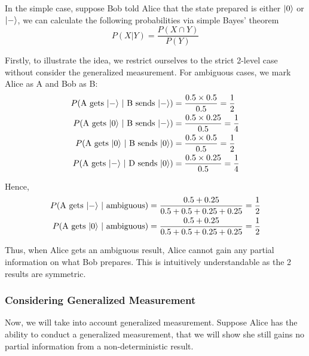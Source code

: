 \documentclass[%
 reprint,
superscriptaddress,
 amsmath,amssymb,
 aps,
]{revtex4-2}
\begin{document}
In the simple case, suppose Bob told Alice that the state prepared is either $\ket{0}$ or $\ket{-}$, we can calculate the following probabilities via simple Bayes' theorem 
\begin{equation}
    P(X|Y) = \frac{P(X \cap Y)}{P(Y)}
\end{equation}

Firstly, to illustrate the idea, we restrict ourselves to the strict 2-level case without consider the generalized measurement. For ambiguous cases, we mark Alice as A and Bob as B:
\begin{equation}
    \begin{split}
        P(\text{A gets $\ket{-}$ $|$ B sends $\ket{-}$})&=\frac{0.5\times 0.5}{0.5}=\frac{1}{2}\\
        P(\text{A gets $\ket{0}$ $|$ B sends $\ket{-}$})&=\frac{0.5\times 0.25}{0.5}=\frac{1}{4}\\
        P(\text{A gets $\ket{0}$ $|$ B sends $\ket{0}$})&=\frac{0.5\times 0.5}{0.5}=\frac{1}{2}\\
        P(\text{A gets $\ket{-}$ $|$ D sends $\ket{0}$})&=\frac{0.5\times 0.25}{0.5}=\frac{1}{4}\\
    \end{split}
\end{equation}

Hence, 
\begin{equation}
    \begin{split}
        P(\text{A gets $\ket{-}$ $|$ ambiguous})&=\frac{0.5+0.25}{0.5+0.5+0.25+0.25}=\frac{1}{2}\\
        P(\text{A gets $\ket{0}$ $|$ ambiguous})&=\frac{0.5+0.25}{0.5+0.5+0.25+0.25}=\frac{1}{2}\\
    \end{split}
\end{equation}

Thus, when Alice gets an ambiguous result, Alice cannot gain any partial information on what Bob prepares. This is intuitively understandable as the 2 results are symmetric. 

\subsubsection{Considering Generalized Measurement}
Now, we will take into account generalized measurement. Suppose Alice has the ability to conduct a generalized measurement, that we will show she still gains no partial information from a non-deterministic result.
\end{document}
